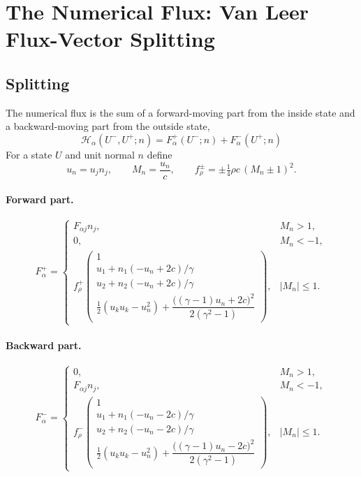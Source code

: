 \documentclass[11pt,a4paper]{article}
\theoremstyle{remark}
\theoremstyle{definition}
\newcommand{\Hf}{\mathcal{H}}
\begin{document}
\section{The Numerical Flux: Van Leer Flux-Vector Splitting}

\subsection{Splitting}
The numerical flux is the sum of a forward-moving part from the inside state and a backward-moving part from the outside state,
\begin{equation}\label{eq:vl}
\boxed{\ \Hf_\alpha(U^-,U^+;n)=F^+_\alpha(U^-;n)+F^-_\alpha(U^+;n)\ }
\end{equation}
For a state $U$ and unit normal $n$ define
\[
u_n=u_jn_j,\qquad M_n=\frac{u_n}{c},\qquad f^\pm_{\rho}=\pm\tfrac14\rho c\,(M_n\pm1)^2 .
\]

\paragraph{Forward part.}
\begin{equation}\label{eq:fplus}
F^+_\alpha=\begin{cases}
F_{\alpha j}n_j, & M_n>1,\\[2pt]
0, & M_n<-1,\\[2pt]
f^+_\rho\begin{pmatrix}1\\[1pt] u_1+n_1(-u_n+2c)/\gamma\\[1pt] u_2+n_2(-u_n+2c)/\gamma\\[1pt] \tfrac12(u_ku_k-u_n^2)+\dfrac{\big((\gamma-1)u_n+2c\big)^2}{2(\gamma^2-1)}\end{pmatrix}, & |M_n|\le1.
\end{cases}
\end{equation}

\paragraph{Backward part.}
\begin{equation}\label{eq:fminus}
F^-_\alpha=\begin{cases}
0, & M_n>1,\\[2pt]
F_{\alpha j}n_j, & M_n<-1,\\[2pt]
f^-_\rho\begin{pmatrix}1\\[1pt] u_1+n_1(-u_n-2c)/\gamma\\[1pt] u_2+n_2(-u_n-2c)/\gamma\\[1pt] \tfrac12(u_ku_k-u_n^2)+\dfrac{\big((\gamma-1)u_n-2c\big)^2}{2(\gamma^2-1)}\end{pmatrix}, & |M_n|\le1.
\end{cases}
\end{equation}
\end{document}
